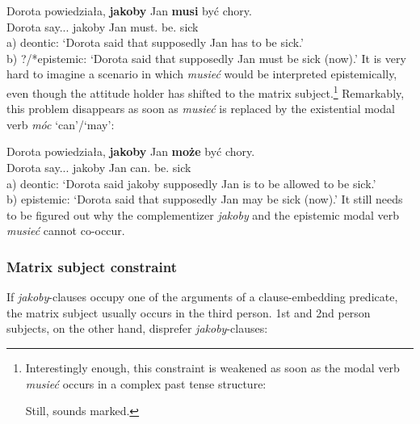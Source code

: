 \documentclass[output=paper]{langsci/langscibook}
\begin{document}
\ea \gll Dorota powiedziała, \textbf{jakoby} Jan \textbf{musi} być chory. \\
		Dorota say.{\lptcp}.{\sg}.{\fem} jakoby Jan must.{\thirdperson}{\sg} be.{\infv} sick \\
\glt	a) deontic: `Dorota said that supposedly Jan has to be sick.'\\
	b) ?/*epistemic: `Dorota said that supposedly Jan must be sick (now).'
\z
It is very hard to imagine a scenario in which \emph{musieć} would be interpreted epistemically, even though the attitude holder has shifted to the matrix subject.{\footnote{Interestingly enough, this constraint is weakened as soon as the modal verb \emph{musieć} occurs in a complex past tense structure:

\z
Still,  sounds marked.}}
 Remarkably, this problem disappears as soon as \emph{musieć} is replaced by the existential modal verb \emph{móc} `can'\slash `may':

\ea \gll Dorota powiedziała, \textbf{jakoby} Jan \textbf{może} być chory. \\
		Dorota say.{\lptcp}.{\sg}.{\fem} jakoby Jan can.{\thirdperson}{\sg} be.{\infv} sick \\
\glt	a) deontic: `Dorota said jakoby supposedly Jan is to be allowed to be sick.'\\
 	b) epistemic: `Dorota said that supposedly Jan may be sick (now).'
\z
It still needs to be figured out why the complementizer \emph{jakoby} and the epistemic modal verb \emph{musieć} cannot co-occur.

\subsubsection{Matrix subject constraint}
If \emph{jakoby}-clauses occupy one of the arguments of a clause-embedding predicate, the matrix subject usually occurs in the third person. 1st and 2nd person subjects, on the other hand, disprefer \emph{jakoby}-clauses:
\end{document}
